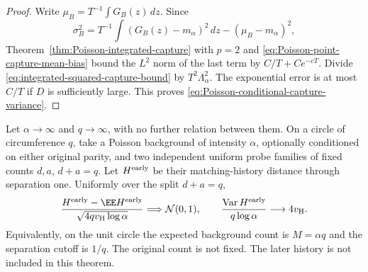 \documentclass[11pt,letterpaper]{article}
\begin{document}
\begin{proof}
Write $\mu_B=T^{-1}\int G_B(z)\,dz$. Since
\[
 \sigma_B^2=T^{-1}\int(G_B(z)-m_\alpha)^2\,dz
                               -(\mu_B-m_\alpha)^2,
\]
Theorem~\ref{thm:Poisson-integrated-capture} with $p=2$ and
\eqref{eq:Poisson-point-capture-mean-bias} bound the $L^2$ norm
of the last term by $C/T+Ce^{-cT}$. Divide
\eqref{eq:integrated-squared-capture-bound} by
$T^2\Lambda_\alpha^2$. The exponential error is at most
$C/T$ if $D$ is sufficiently large. This proves
\eqref{eq:Poisson-conditional-capture-variance}.
\end{proof}

\begin{theorem}
\label{thm:Poisson-early-history-CLT}
Let $\alpha\to\infty$ and $q\to\infty$, with no further
relation between them. On a circle of circumference $q$,
take a Poisson background of intensity $\alpha$, optionally
conditioned on either original parity, and two independent
uniform probe families of fixed counts $d,a$, $d+a=q$.
Let $H^{\rm early}$ be their matching-history distance through
separation one. Uniformly over the split $d+a=q$,
\begin{equation}\label{eq:Poisson-early-history-CLT}
 \frac{H^{\rm early}-\EE H^{\rm early}}
          {\sqrt{4qv_{\rm H}\log\alpha}}
       \Longrightarrow\mathcal N(0,1),\qquad
 \frac{\operatorname{Var}H^{\rm early}}
                {q\log\alpha}\longrightarrow4v_{\rm H}.
\end{equation}
Equivalently, on the unit circle the expected background count
is $M=\alpha q$ and the separation cutoff is $1/q$.
The original count is not fixed. The later history is not
included in this theorem.
\end{theorem}
\end{document}
